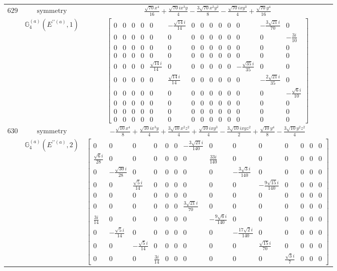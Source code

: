 \documentclass[fleqn,8pt,landscape]{jsarticle}
\begin{document}
\begin{longtable}{ccc}
$ 629 $ & $ \text{symmetry} $ & $ \frac{\sqrt{70} x^{4}}{16} + \frac{\sqrt{70} i x^{3} y}{4} - \frac{3 \sqrt{70} x^{2} y^{2}}{8} - \frac{\sqrt{70} i x y^{3}}{4} + \frac{\sqrt{70} y^{4}}{16} $ \\
$  $ & $ \mathbb{G}_{4}^{(a)}(E^{\prime\prime(a)},1) $ & $ \begin{bmatrix} 0 & 0 & 0 & 0 & 0 & - \frac{\sqrt{14} i}{14} & 0 & 0 & 0 & 0 & 0 & 0 & - \frac{3 \sqrt{21} i}{70} & 0 \\ 0 & 0 & 0 & 0 & 0 & 0 & 0 & 0 & 0 & 0 & 0 & 0 & 0 & - \frac{3 i}{10} \\ 0 & 0 & 0 & 0 & 0 & 0 & 0 & 0 & 0 & 0 & 0 & 0 & 0 & 0 \\ 0 & 0 & 0 & 0 & 0 & 0 & 0 & 0 & 0 & 0 & 0 & 0 & 0 & 0 \\ 0 & 0 & 0 & 0 & \frac{\sqrt{14} i}{14} & 0 & 0 & 0 & 0 & 0 & 0 & - \frac{\sqrt{35} i}{35} & 0 & 0 \\ 0 & 0 & 0 & 0 & 0 & \frac{\sqrt{14} i}{14} & 0 & 0 & 0 & 0 & 0 & 0 & - \frac{2 \sqrt{21} i}{35} & 0 \\ 0 & 0 & 0 & 0 & 0 & 0 & 0 & 0 & 0 & 0 & 0 & 0 & 0 & - \frac{\sqrt{6} i}{10} \\ 0 & 0 & 0 & 0 & 0 & 0 & 0 & 0 & 0 & 0 & 0 & 0 & 0 & 0 \\ 0 & 0 & 0 & 0 & 0 & 0 & 0 & 0 & 0 & 0 & 0 & 0 & 0 & 0 \\ 0 & 0 & 0 & 0 & 0 & 0 & 0 & 0 & 0 & 0 & 0 & 0 & 0 & 0 \end{bmatrix} $ \\ \hline
$ 630 $ & $ \text{symmetry} $ & $ - \frac{\sqrt{10} x^{4}}{8} + \frac{\sqrt{10} i x^{3} y}{4} + \frac{3 \sqrt{10} x^{2} z^{2}}{4} + \frac{\sqrt{10} i x y^{3}}{4} - \frac{3 \sqrt{10} i x y z^{2}}{2} + \frac{\sqrt{10} y^{4}}{8} - \frac{3 \sqrt{10} y^{2} z^{2}}{4} $ \\
$  $ & $ \mathbb{G}_{4}^{(a)}(E^{\prime\prime(a)},2) $ & $ \begin{bmatrix} 0 & 0 & 0 & 0 & 0 & 0 & - \frac{3 \sqrt{21} i}{140} & 0 & 0 & 0 & 0 & 0 & 0 & 0 \\ \frac{\sqrt{6} i}{28} & 0 & 0 & 0 & 0 & 0 & 0 & \frac{33 i}{140} & 0 & 0 & 0 & 0 & 0 & 0 \\ 0 & - \frac{\sqrt{30} i}{28} & 0 & 0 & 0 & 0 & 0 & 0 & - \frac{3 \sqrt{3} i}{140} & 0 & 0 & 0 & 0 & 0 \\ 0 & 0 & \frac{\sqrt{5} i}{14} & 0 & 0 & 0 & 0 & 0 & 0 & - \frac{9 \sqrt{15} i}{140} & 0 & 0 & 0 & 0 \\ 0 & 0 & 0 & 0 & 0 & 0 & 0 & 0 & 0 & 0 & 0 & 0 & 0 & 0 \\ 0 & 0 & 0 & 0 & 0 & 0 & \frac{3 \sqrt{21} i}{70} & 0 & 0 & 0 & 0 & 0 & 0 & 0 \\ \frac{3 i}{14} & 0 & 0 & 0 & 0 & 0 & 0 & - \frac{9 \sqrt{6} i}{140} & 0 & 0 & 0 & 0 & 0 & 0 \\ 0 & - \frac{\sqrt{5} i}{14} & 0 & 0 & 0 & 0 & 0 & 0 & - \frac{17 \sqrt{2} i}{140} & 0 & 0 & 0 & 0 & 0 \\ 0 & 0 & - \frac{\sqrt{5} i}{14} & 0 & 0 & 0 & 0 & 0 & 0 & \frac{\sqrt{15} i}{70} & 0 & 0 & 0 & 0 \\ 0 & 0 & 0 & \frac{3 i}{14} & 0 & 0 & 0 & 0 & 0 & 0 & \frac{\sqrt{3} i}{7} & 0 & 0 & 0 \end{bmatrix} $ \\ \hline

\end{longtable}
\end{document}
